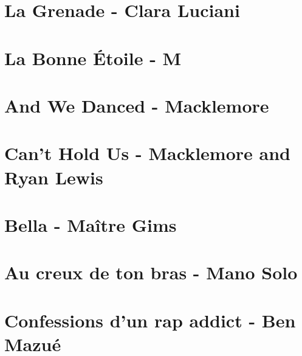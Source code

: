 \documentclass{guitartabs}
\begin{document}
\section{La Grenade - Clara Luciani}
\begin{guitar}

\end{guitar}

\section{La Bonne Étoile - M}
\begin{guitar}

\end{guitar}

\section{And We Danced - Macklemore}
\begin{guitar}

\end{guitar}

\section{Can't Hold Us - Macklemore and Ryan Lewis}
\begin{guitar}

\end{guitar}

\section{Bella - Maître Gims}
\begin{guitar}

\end{guitar}


\section{Au creux de ton bras - Mano Solo}
\begin{guitar}

\end{guitar}


\section{Confessions d'un rap addict - Ben Mazué}
\begin{guitar}

\end{guitar}
\end{document}

